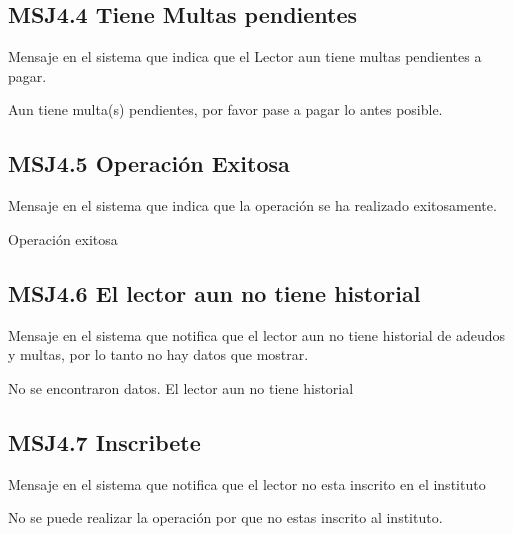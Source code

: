   \subsection{MSJ4.4 Tiene Multas pendientes }

Mensaje en el sistema que indica que el Lector aun tiene multas pendientes a pagar.

  \noindent Aun tiene multa(s) pendientes, por favor pase a pagar lo antes posible.
  
    \subsection{MSJ4.5 Operación Exitosa }

Mensaje en el sistema que indica que la operación se ha realizado exitosamente.

  \noindent Operación exitosa
  
      \subsection{MSJ4.6 El lector aun no tiene historial }

Mensaje en el sistema que notifica que el lector aun no tiene historial de adeudos y multas, por lo tanto no hay datos que mostrar.

  \noindent No se encontraron datos. El lector aun no tiene historial
  
  \subsection{MSJ4.7 Inscribete}

Mensaje en el sistema que notifica que el lector no esta inscrito en el instituto

  \noindent No se puede realizar la operación por que no estas inscrito al instituto.




